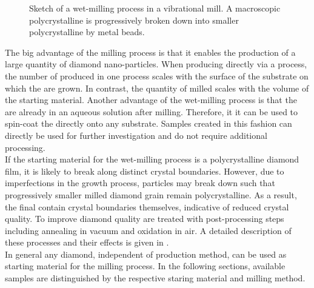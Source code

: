 	\begin{figure}[htp]
		\centering
		\caption[Wet-milling in a vibrational mill]{Sketch of a wet-milling process in a vibrational mill. A macroscopic polycrystalline \nd is progressively broken down into smaller polycrystalline \nds by metal beads.}\label{fig::sketch_milling}
	\end{figure}

	The big advantage of the milling process is that it enables the production of a large quantity of diamond nano-particles.
	When producing \nds directly via a \CVD process, the number of produced \nds in one process scales with the surface of the substrate on which the \nds are grown.
	In contrast, the quantity of milled \nds scales with the volume of the starting material.
	Another advantage of the wet-milling process is that the \nds are already in an aqueous solution after milling.
	Therefore, it it can be used to spin-coat the \nds directly onto any substrate. Samples created in this fashion can directly be used for further investigation and do not require additional processing.
	\\
	If the starting material for the wet-milling process is a polycrystalline diamond film, it is likely to break along distinct crystal boundaries.
	However, due to imperfections in the growth process, particles may break down such that progressively smaller milled diamond grain remain polycrystalline.
	As a result, the final \nds contain crystal boundaries themselves, indicative of reduced crystal quality.
	To improve diamond quality \nds are treated with post-processing steps including annealing in vacuum and oxidation in air.
	A detailed description of these processes and their effects is given in .
	\\
	In general any diamond, independent of production method, can be used as starting material for the milling process.
	In the following sections, available samples are distinguished by the respective staring material and milling method.

